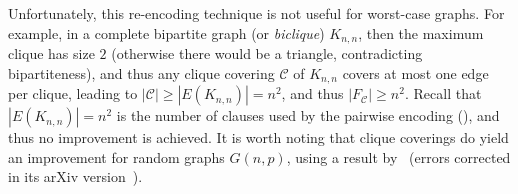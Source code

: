 \documentclass[11pt]{article}
\begin{document}
Unfortunately, this re-encoding technique is not useful for worst-case graphs. For example, in a complete bipartite graph (or \emph{biclique}) $K_{n, n}$, then the maximum clique has size $2$ (otherwise there would be a triangle, contradicting bipartiteness), and thus any clique covering $\mathcal{C}$ of $K_{n, n}$ covers at most one edge per clique, leading to $|\mathcal{C}| \geq |E(K_{n,n})| = n^2$, and thus $|F_\mathcal{C}| \geq n^2$. Recall that $|E(K_{n, n})| = n^2$ is the number of clauses used by the pairwise encoding (), and thus no improvement is achieved.
It is worth noting that clique coverings do yield an improvement for random graphs $G(n, p)$, using a result by~\citet{friezeCoveringEdgesRandom1995} (errors corrected in its arXiv version~\citep{frieze2011coveringedgesrandomgraph}).
\end{document}
